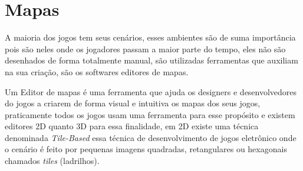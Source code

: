 
\section{Mapas}
\label{sec-mapas}

A maioria dos jogos tem seus cenários, esses ambientes são de suma importância pois são neles onde os jogadores passam a maior parte do tempo, eles não são desenhados de forma totalmente manual, são utilizadas ferramentas que auxiliam na sua criação, são os softwares editores de mapas.

Um Editor de mapas é uma ferramenta que ajuda os designers e desenvolvedores do jogos a criarem de forma visual e intuitiva os mapas dos seus jogos, praticamente todos os jogos usam uma ferramenta para esse propósito e existem editores 2D quanto 3D para essa finalidade, em 2D existe uma técnica denominada \textit{Tile-Based} essa técnica de desenvolvimento de jogos eletrônico onde o cenário é feito por pequenas imagens quadradas, retangulares ou hexagonais chamados \textit{tiles} (ladrilhos).

